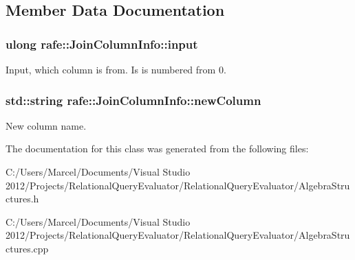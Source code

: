 \subsection{Member Data Documentation}
\hypertarget{classrafe_1_1_join_column_info_af141ca99e62ec1ac85227b9da443a5f4}{
\subsubsection[{input}]{\setlength{\rightskip}{0pt plus 5cm}ulong rafe\+::\+Join\+Column\+Info\+::input}}\label{classrafe_1_1_join_column_info_af141ca99e62ec1ac85227b9da443a5f4}
Input, which column is from. Is is numbered from 0. \hypertarget{classrafe_1_1_join_column_info_af79ae87d9170139440abfac3fd89e199}{
\subsubsection[{new\+Column}]{\setlength{\rightskip}{0pt plus 5cm}std\+::string rafe\+::\+Join\+Column\+Info\+::new\+Column}}\label{classrafe_1_1_join_column_info_af79ae87d9170139440abfac3fd89e199}
New column name. 

The documentation for this class was generated from the following files\+:\begin{DoxyCompactItemize}
\item 
C\+:/\+Users/\+Marcel/\+Documents/\+Visual Studio 2012/\+Projects/\+Relational\+Query\+Evaluator/\+Relational\+Query\+Evaluator/Algebra\+Structures.\+h\item 
C\+:/\+Users/\+Marcel/\+Documents/\+Visual Studio 2012/\+Projects/\+Relational\+Query\+Evaluator/\+Relational\+Query\+Evaluator/Algebra\+Structures.\+cpp\end{DoxyCompactItemize}
